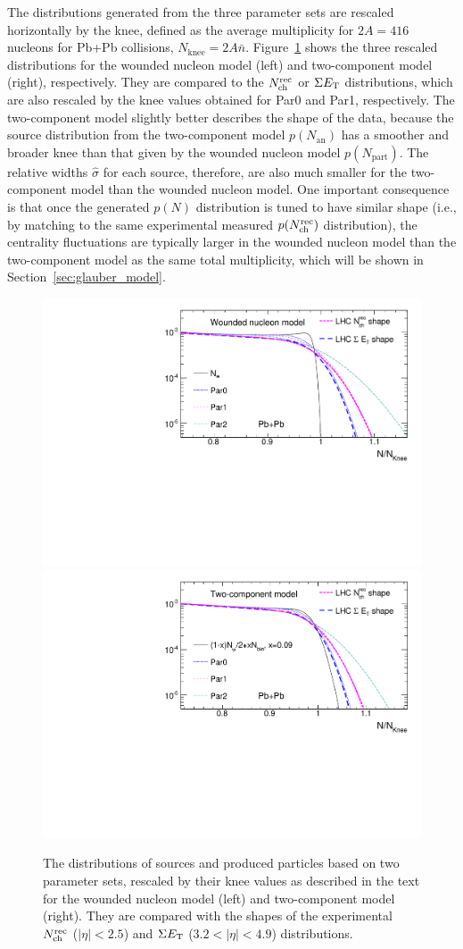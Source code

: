 The distributions generated from the three parameter sets are rescaled horizontally by the knee, defined as the average multiplicity for $2A=416$ nucleons for Pb+Pb collisions, $N_\text{knee}=2A\bar{n}$. Figure~\ref{fig:centfluc_Glauber_Ndis} shows the three rescaled distributions for the wounded nucleon model (left) and two-component model (right), respectively. They are compared to the $N_\text{ch}^\text{rec}$ or $\Sigma E_\text{T}$ distributions, which are also rescaled by the knee values obtained for Par0 and Par1, respectively. The two-component model slightly better describes the shape of the data, because the source distribution from the two-component model $p(N_\text{an})$ has a smoother and broader knee than that given by the wounded nucleon model $p(N_\text{part})$. The relative widths $\hat{\sigma}$ for each source, therefore, are also much smaller for the two-component model than the wounded nucleon model. One important consequence is that once the generated $p(N)$ distribution is tuned to have similar shape (i.e., by matching to the same experimental measured $p(N_\text{ch}^\text{rec})$ distribution), the centrality fluctuations are typically larger in the wounded nucleon model than the two-component model as the same total multiplicity, which will be shown in Section~\ref{sec:glauber_model}.

\begin{figure}[H]
\centering
\includegraphics[width=.475\linewidth]{figs/chapter_centfluc/Glauber_Ndis_Nw.pdf}
\includegraphics[width=.475\linewidth]{figs/chapter_centfluc/Glauber_Ndis_Nan.pdf}
\caption{The distributions of sources and produced particles based on two parameter sets, rescaled by their knee values as described in the text for the wounded nucleon model (left) and two-component model (right). They are compared with the shapes of the experimental $N_\text{ch}^\text{rec}$ ($|\eta|<2.5$) and $\Sigma E_\text{T}$ ($3.2<|\eta|<4.9$) distributions.}
\label{fig:centfluc_Glauber_Ndis}
\end{figure}

